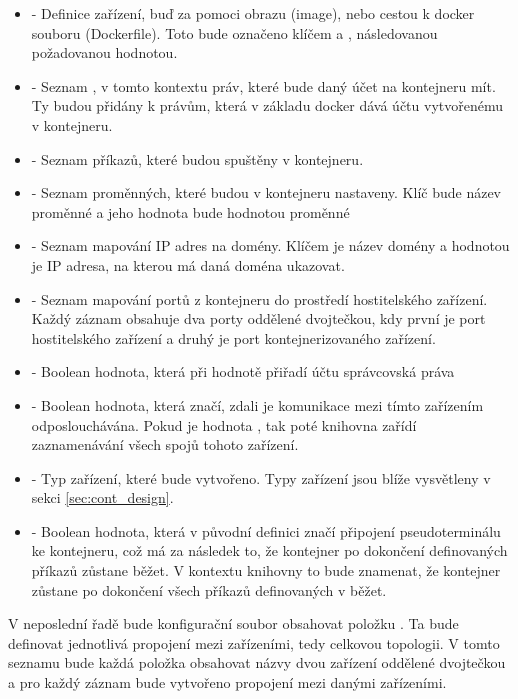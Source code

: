 \begin{itemize}
    \item{} - Definice zařízení, buď za pomoci obrazu (image), nebo cestou k docker souboru (Dockerfile). Toto bude označeno klíčem  a , následovanou požadovanou hodnotou.
    \item{} - Seznam , v tomto kontextu práv, které bude daný účet na kontejneru mít. Ty budou přidány k právům, která v základu docker dává účtu vytvořenému v kontejneru. 
    \item{} - Seznam příkazů, které budou spuštěny v kontejneru.
    \item{} - Seznam proměnných, které budou v kontejneru nastaveny. Klíč bude název proměnné a jeho hodnota bude hodnotou proměnné
    \item{} - Seznam mapování IP adres na domény. Klíčem je název domény a hodnotou je IP adresa, na kterou má daná doména ukazovat.
    \item{} - Seznam mapování portů z kontejneru do prostředí hostitelského zařízení. Každý záznam obsahuje dva porty oddělené dvojtečkou, kdy první je port hostitelského zařízení a druhý je port kontejnerizovaného zařízení.
    \item{} - Boolean hodnota, která při hodnotě  přiřadí účtu správcovská práva
    \item{} - Boolean hodnota, která značí, zdali je komunikace mezi tímto zařízením odposlouchávána. Pokud je hodnota , tak poté knihovna zařídí zaznamenávání všech spojů tohoto zařízení.
    \item{} - Typ zařízení, které bude vytvořeno. Typy zařízení jsou blíže vysvětleny v sekci \ref{sec:cont_design}.
    \item{} - Boolean hodnota, která v původní definici značí připojení pseudoterminálu ke kontejneru, což má za následek to, že kontejner po dokončení definovaných příkazů zůstane běžet. V kontextu knihovny to bude znamenat, že kontejner zůstane po dokončení všech příkazů definovaných v  běžet. 
\end{itemize}

V neposlední řadě bude konfigurační soubor obsahovat položku . Ta bude definovat jednotlivá propojení mezi zařízeními, tedy celkovou topologii. V tomto seznamu bude každá položka obsahovat názvy dvou zařízení oddělené dvojtečkou a pro každý záznam bude vytvořeno propojení mezi danými zařízeními.

